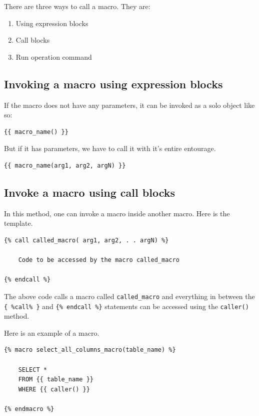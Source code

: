 \documentclass[
]{book}
\begin{document}
There are three ways to call a macro. They are:

\begin{enumerate}
\def\labelenumi{\arabic{enumi}.}
\item
  Using expression blocks
\item
  Call blocks
\item
  Run operation command
\end{enumerate}

\hypertarget{invoking-a-macro-using-expression-blocks}{%
\subsection{Invoking a macro using expression blocks}\label{invoking-a-macro-using-expression-blocks}}

If the macro does not have any parameters, it can be invoked as a solo object like so:

\begin{verbatim}
{{ macro_name() }}
\end{verbatim}

But if it has parameters, we have to call it with it's entire entourage.

\begin{verbatim}
{{ macro_name(arg1, arg2, argN) }}
\end{verbatim}

\hypertarget{invoke-a-macro-using-call-blocks}{%
\subsection{Invoke a macro using call blocks}\label{invoke-a-macro-using-call-blocks}}

In this method, one can invoke a macro inside another macro. Here is the template.

\begin{verbatim}
{% call called_macro( arg1, arg2, . . argN) %}

    Code to be accessed by the macro called_macro

{% endcall %}
\end{verbatim}

The above code calls a macro called \texttt{called\_macro} and everything in between the \texttt{\{\ \%call\%\ \}} and \texttt{\{\%\ endcall\ \%\}} statements can be accessed using the \texttt{caller()} method.

Here is an example of a macro.

\begin{verbatim}
{% macro select_all_columns_macro(table_name) %}

    SELECT *
    FROM {{ table_name }}
    WHERE {{ caller() }}

{% endmacro %}
\end{verbatim}
\end{document}
